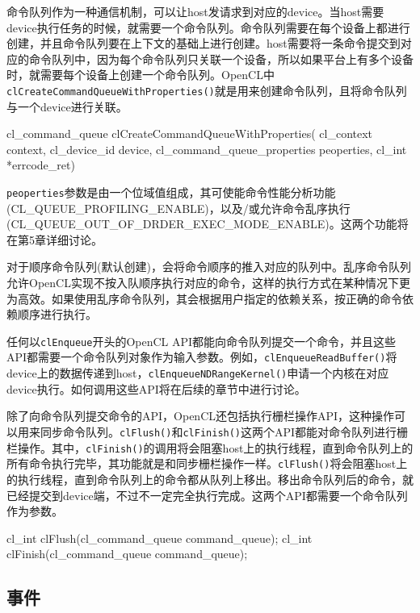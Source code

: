 命令队列作为一种通信机制，可以让host发请求到对应的device。当host需要device执行任务的时候，就需要一个命令队列。命令队列需要在每个设备上都进行创建，并且命令队列要在上下文的基础上进行创建。host需要将一条命令提交到对应的命令队列中，因为每个命令队列只关联一个设备，所以如果平台上有多个设备时，就需要每个设备上创建一个命令队列。OpenCL中\texttt{clCreateCommandQueueWithProperties()}就是用来创建命令队列，且将命令队列与一个device进行关联。

\begin{codebox}[cpp]
cl_command_queue
clCreateCommandQueueWithProperties(
  cl_context context,
  cl_device_id device,
  cl_command_queue_properties peoperties,
  cl_int *errcode_ret)
\end{codebox}

\texttt{peoperties}参数是由一个位域值组成，其可使能命令性能分析功能(CL\_\allowbreak{}QUEUE\_\allowbreak{}PROFILING\_\allowbreak{}ENABLE)，以及/或允许命令乱序执行(CL\_\allowbreak{}QUEUE\_\allowbreak{}OUT\_\allowbreak{}OF\_\allowbreak{}DRDER\_\allowbreak{}EXEC\_\allowbreak{}MODE\_\allowbreak{}ENABLE)。这两个功能将在第5章详细讨论。

对于顺序命令队列(默认创建)，会将命令顺序的推入对应的队列中。乱序命令队列允许OpenCL实现不按入队顺序执行对应的命令，这样的执行方式在某种情况下更为高效。如果使用乱序命令队列，其会根据用户指定的依赖关系，按正确的命令依赖顺序进行执行。

任何以\texttt{clEnqueue}开头的OpenCL API都能向命令队列提交一个命令，并且这些API都需要一个命令队列对象作为输入参数。例如，\texttt{clEnqueueReadBuffer()}将device上的数据传递到host，\texttt{clEnqueueNDRangeKernel()}申请一个内核在对应device执行。如何调用这些API将在后续的章节中进行讨论。

除了向命令队列提交命令的API，OpenCL还包括执行栅栏操作API，这种操作可以用来同步命令队列。\texttt{clFlush()}和\texttt{clFinish()}这两个API都能对命令队列进行栅栏操作。其中，\texttt{clFinish()}的调用将会阻塞host上的执行线程，直到命令队列上的所有命令执行完毕，其功能就是和同步栅栏操作一样。\texttt{clFlush()}将会阻塞host上的执行线程，直到命令队列上的命令都从队列上移出。移出命令队列后的命令，就已经提交到device端，不过不一定完全执行完成。这两个API都需要一个命令队列作为参数。

\begin{codebox}[cpp]
cl_int clFlush(cl_command_queue command_queue);
cl_int clFinish(cl_command_queue command_queue);
\end{codebox}

\subsection{事件}

